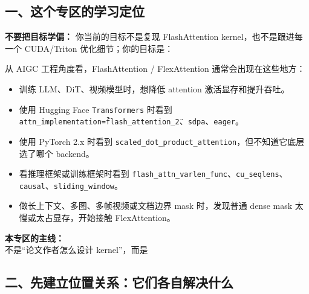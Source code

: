 \subsection{一、这个专区的学习定位}

\begin{warnbox}
\textbf{不要把目标学偏：} 你当前的目标不是复现 FlashAttention kernel，也不是跟进每一个 CUDA/Triton 优化细节；你的目标是：
\end{warnbox}

从 AIGC 工程角度看，FlashAttention / FlexAttention 通常会出现在这些地方：
\begin{itemize}[leftmargin=1.5em]
  \item 训练 LLM、DiT、视频模型时，想降低 attention 激活显存和提升吞吐。
  \item 使用 Hugging Face \texttt{Transformers} 时看到 \texttt{attn\_implementation=\"flash\_attention\_2\"}、\texttt{sdpa}、\texttt{eager}。
  \item 使用 PyTorch 2.x 时看到 \texttt{scaled\_dot\_product\_attention}，但不知道它底层选了哪个 backend。
  \item 看推理框架或训练框架时看到 \texttt{flash\_attn\_varlen\_func}、\texttt{cu\_seqlens}、\texttt{causal}、\texttt{sliding\_window}。
  \item 做长上下文、多图、多帧视频或文档边界 mask 时，发现普通 dense mask 太慢或太占显存，开始接触 FlexAttention。
\end{itemize}

\begin{summarybox}
\textbf{本专区的主线：}\\
不是“论文作者怎么设计 kernel”，而是 
\end{summarybox}

\subsection{二、先建立位置关系：它们各自解决什么}

